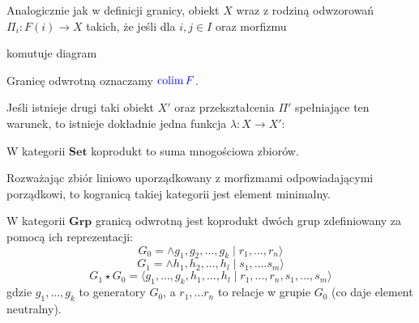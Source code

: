 \begin{definition}
  Analogicznie jak w definicji granicy, obiekt $X$ wraz z rodziną odwzorowań $\Pi_i:F(i)\to X$ takich, że jeśli dla $i,j\in I$ oraz morfizmu  komutuje diagram
  \begin{center}\end{center}
  Granicę odwrotną oznaczamy $\color{blue}\operatorname{colim} F$. 

  Jeśli istnieje drugi taki obiekt $X'$ oraz przekształcenia $\Pi'$ spełniające ten warunek, to istnieje dokładnie jedna funkcja $\lambda:X\to X'$:
  \begin{center}\end{center}
\end{definition}

\begin{example}
\item W kategorii $\mathbf{Set}$ koprodukt to suma mnogościowa zbiorów.
\item Rozważając zbiór liniowo uporządkowany z morfizmami odpowiadającymi porządkowi, to kogranicą takiej kategorii jest element minimalny.
\item W kategorii $\mathbf{Grp}$ granicą odwrotną jest koprodukt dwóch grup zdefiniowany za pomocą ich reprezentacji:
  $$G_0=\land g_1, g_2,...,g_k\;|\;r_1,...,r_n\rangle$$
  $$G_1=\land h_1, h_2,...,h_l\;|\;s_1,....s_m\rangle$$
  $$G_1\star G_0=\langle g_1,...,g_k, h_1,...,h_l\;|\;r_1,...,r_n, s_1,...,s_m\rangle$$
  gdzie $g_1,...,g_k$ to generatory $G_0$, a $r_1,...r_n$ to relacje w grupie $G_0$ (co daje element neutralny).
\end{example}

